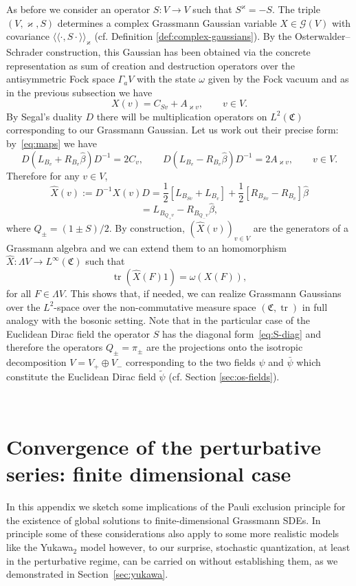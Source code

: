 \documentclass{article}
\newcommand{\assign}{:=}
\newcommand{\llangle}{{\langle\!\langle}}
\newcommand{\rrangle}{{\rangle\!\rangle}}
\newcommand{\tmop}[1]{\ensuremath{\operatorname{#1}}}
\begin{document}
As before we consider an operator $S : V \rightarrow V$ such that
$S^{\varkappa} = - S$. The triple $(V, \varkappa, S)$ determines a complex
Grassmann Gaussian variable $X \in \mathcal{G} (V)$ with covariance $\llangle
\cdot, S \cdot \rrangle_{\varkappa}$ (cf. Definition
\ref{def:complex-gaussians}). By the Osterwalder--Schrader construction, this
Gaussian has been obtained via the concrete representation as sum of creation
and destruction operators over the antisymmetric Fock space $\Gamma_a V$ with
the state $\omega$ given by the Fock vacuum and as in the previous subsection
we have
\[ X (v) = C_{S v} + A_{\varkappa v}, \qquad v \in V. \]
By Segal's duality $D$ there will be multiplication operators on $L^2
(\mathfrak{C})$ corresponding to our Grassmann Gaussian. Let us work out their
precise form: by~{\eqref{eq:maps}} we have
\[ D (L_{B_v} + R_{B_v} \hat{\beta}) D^{- 1} = 2 C_v, \qquad D (L_{B_v} -
   R_{B_v} \hat{\beta}) D^{- 1} = 2 A_{\varkappa v}, \qquad v \in V. \]
Therefore for any $v \in V$,
\[ \hat{X} (v) \assign D^{- 1} X (v) D = \frac{1}{2} [L_{B_{S v}} + L_{B_v}] +
   \frac{1}{2} [R_{B_{S v}} - R_{B_v}] \hat{\beta} \]
\[ = L_{B_{Q_+ v}} - R_{B_{Q_- v}} \hat{\beta}, \]
where $Q_{\pm} = (1 \pm S) / 2$. By construction, $(\hat{X} (v))_{v \in V}$
are the generators of a Grassmann algebra and we can extend them to an
homomorphism $\hat{X} : \Lambda V \rightarrow L^{\infty} (\mathfrak{C})$ such
that
\[ \tmop{tr} (\hat{X} (F) 1) = \omega (X (F)), \]
for all $F \in \Lambda V$. This shows that, if needed, we can realize
Grassmann Gaussians over the $L^2$-space over the non-commutative measure
space $(\mathfrak{C}, \tmop{tr})$ in full analogy with the bosonic setting.
Note that in the particular case of the Euclidean Dirac field the operator $S$
has the diagonal form~{\eqref{eq:S-diag}} and therefore the operators $Q_{\pm}
= \pi_{\pm}$ are the projections onto the isotropic decomposition $V = V_+
\oplus V_-$ corresponding to the two fields $\psi$ and $\bar{\psi}$ which
constitute the Euclidean Dirac field $\tilde{\psi}$ (cf. Section
\ref{sec:os-fields}).

\

\section{Convergence of the perturbative series: finite dimensional
case}\label{app:series}

In this appendix we sketch some implications of the Pauli exclusion principle
for the existence of global solutions to finite-dimensional Grassmann SDEs. In
principle some of these considerations also apply to some more realistic
models like the Yukawa$_2$ model however, to our surprise, stochastic
quantization, at least in the perturbative regime, can be carried on without
establishing them, as we demonstrated in Section~\ref{sec:yukawa}.
\end{document}
